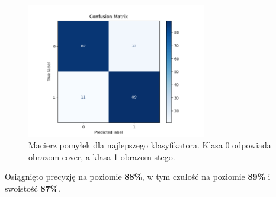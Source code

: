 \begin{figure}[ht!]
	\centering
	\includegraphics[width=0.7\textwidth]{./img/dct_match_confusion_matrx.png}
	\caption{\label{fig:dct_match_confusion_matrix} Macierz pomyłek dla najlepszego klasyfikatora. Klasa 0 odpowiada obrazom cover, a klasa 1 obrazom stego.}
\end{figure}

Osiągnięto precyzję na poziomie \textbf{88\%}, w tym czułość na poziomie \textbf{89\%} i swoistość \textbf{87\%}.
